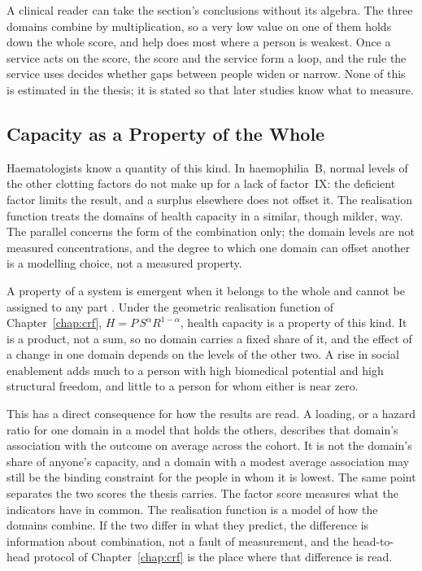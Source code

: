 A clinical reader can take the section's conclusions without its algebra. The
three domains combine by multiplication, so a very low value on one of them holds
down the whole score, and help does most where a person is weakest. Once a
service acts on the score, the score and the service form a loop, and the rule
the service uses decides whether gaps between people widen or narrow. None of
this is estimated in the thesis; it is stated so that later studies know what to
measure.

\subsection{Capacity as a Property of the Whole}
\label{sec:disc-sys-emergence}

Haematologists know a quantity of this kind. In haemophilia~B, normal levels of
the other clotting factors do not make up for a lack of factor~IX: the deficient
factor limits the result, and a surplus elsewhere does not offset it. The
realisation function treats the domains of health capacity in a similar, though
milder, way. The parallel concerns the form of the combination only; the domain
levels are not measured concentrations, and the degree to which one domain can
offset another is a modelling choice, not a measured property.

A property of a system is emergent when it belongs to the whole and cannot be
assigned to any part \citep{vonbertalanffy_1968}. Under the geometric realisation
function of Chapter~\ref{chap:crf}, $H=P\,S^{\alpha}R^{1-\alpha}$, health capacity
is a property of this kind. It is a product, not a sum, so no domain carries a fixed
share of it, and the effect of a change in one domain depends on the levels of the
other two. A rise in social enablement adds much to a person with high biomedical
potential and high structural freedom, and little to a person for whom either is
near zero.

This has a direct consequence for how the results are read. A loading, or a hazard
ratio for one domain in a model that holds the others, describes that domain's
association with the outcome on average across the cohort. It is not the domain's
share of anyone's capacity, and a domain with a modest average association may
still be the binding constraint for the people in whom it is lowest. The same point
separates the two scores the thesis carries. The factor score measures what the
indicators have in common. The realisation function is a model of how the domains
combine. If the two differ in what they predict, the difference is information about
combination, not a fault of measurement, and the head-to-head protocol of
Chapter~\ref{chap:crf} is the place where that difference is read.

